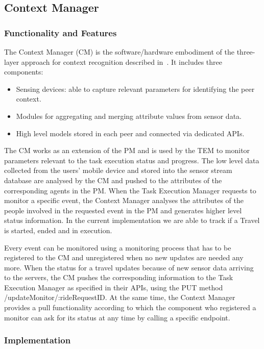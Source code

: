 \subsection{Context Manager}
\subsubsection{Functionality and Features}

The Context Manager (CM) is the software/hardware embodiment of the three-layer approach for context recognition described in~\cite{D4.3}. It includes three components:
\begin{itemize}
\item Sensing devices: able to capture relevant parameters for identifying the peer context.
\item Modules for aggregating and merging attribute values from sensor data.
\item High level models stored in each peer and connected via dedicated APIs.
\end{itemize}
The CM works as an extension of the PM and is used by the TEM to monitor parameters relevant to the task execution status and progress. The low level data collected from the users' mobile device and stored into the sensor stream database are analysed by the CM and pushed to the attributes of the corresponding agents in the PM. When the Task Execution Manager requests to monitor a specific event, the Context Manager analyses the attributes of the people involved in the requested event in the PM and generates higher level status information. In the current implementation we are able to track if a Travel is started, ended and in execution.

Every event can be monitored using a monitoring process that has to be registered to the CM and unregistered when no new updates are needed any more. When the status for a travel updates because of new sensor data arriving to the servers, the CM pushes the corresponding information to the Task Execution Manager as specified in their APIs, using the PUT method /updateMonitor/:rideRequestID. At the same time, the Context Manager provides a pull functionality according to which the component who registered a monitor can ask for its status at any time by calling a specific endpoint.

\subsubsection{Implementation}


